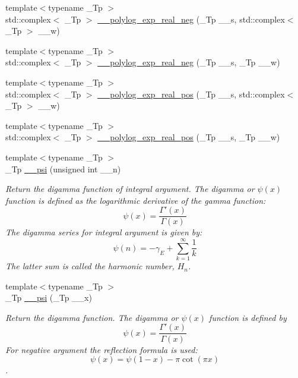 \begin{DoxyCompactItemize}
{\footnotesize template$<$typename \+\_\+\+Tp $>$ }\\std\+::complex$<$ \+\_\+\+Tp $>$ \hyperlink{namespacestd_1_1____detail_abe2e38af779623f338c77dc46ac673bd}{\+\_\+\+\_\+polylog\+\_\+exp\+\_\+real\+\_\+neg} (\+\_\+\+Tp \+\_\+\+\_\+s, std\+::complex$<$ \+\_\+\+Tp $>$ \+\_\+\+\_\+w)
\item 
{\footnotesize template$<$typename \+\_\+\+Tp $>$ }\\std\+::complex$<$ \+\_\+\+Tp $>$ \hyperlink{namespacestd_1_1____detail_ac9ae4e4771187bac37c1ccc83719feb2}{\+\_\+\+\_\+polylog\+\_\+exp\+\_\+real\+\_\+neg} (\+\_\+\+Tp \+\_\+\+\_\+s, \+\_\+\+Tp \+\_\+\+\_\+w)
\item 
{\footnotesize template$<$typename \+\_\+\+Tp $>$ }\\std\+::complex$<$ \+\_\+\+Tp $>$ \hyperlink{namespacestd_1_1____detail_ab27023a3d94393d41c994000b2c16684}{\+\_\+\+\_\+polylog\+\_\+exp\+\_\+real\+\_\+pos} (\+\_\+\+Tp \+\_\+\+\_\+s, std\+::complex$<$ \+\_\+\+Tp $>$ \+\_\+\+\_\+w)
\item 
{\footnotesize template$<$typename \+\_\+\+Tp $>$ }\\std\+::complex$<$ \+\_\+\+Tp $>$ \hyperlink{namespacestd_1_1____detail_ad77bb9953443dfb1575a61a4573c6913}{\+\_\+\+\_\+polylog\+\_\+exp\+\_\+real\+\_\+pos} (\+\_\+\+Tp \+\_\+\+\_\+s, \+\_\+\+Tp \+\_\+\+\_\+w)
\item 
{\footnotesize template$<$typename \+\_\+\+Tp $>$ }\\\+\_\+\+Tp \hyperlink{namespacestd_1_1____detail_a664d83a211283d0975ba40f3874c2d70}{\+\_\+\+\_\+psi} (unsigned int \+\_\+\+\_\+n)
\begin{DoxyCompactList}\small\item\em Return the digamma function of integral argument. The digamma or $ \psi(x) $ function is defined as the logarithmic derivative of the gamma function\+: \[ \psi(x) = \frac{\Gamma'(x)}{\Gamma(x)} \] The digamma series for integral argument is given by\+: \[ \psi(n) = -\gamma_E + \sum_{k=1}^{\infty} \frac{1}{k} \] The latter sum is called the harmonic number, $ H_n $. \end{DoxyCompactList}\item 
{\footnotesize template$<$typename \+\_\+\+Tp $>$ }\\\+\_\+\+Tp \hyperlink{namespacestd_1_1____detail_ad7246a3ca90be800e6cc79c8e2360abd}{\+\_\+\+\_\+psi} (\+\_\+\+Tp \+\_\+\+\_\+x)
\begin{DoxyCompactList}\small\item\em Return the digamma function. The digamma or $ \psi(x) $ function is defined by \[ \psi(x) = \frac{\Gamma'(x)}{\Gamma(x)} \] For negative argument the reflection formula is used\+: \[ \psi(x) = \psi(1-x) - \pi \cot(\pi x) \]. \end{DoxyCompactList}\item 

\end{DoxyCompactItemize}

